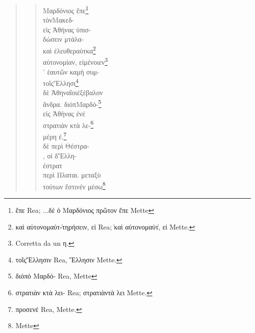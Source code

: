     \begin{quotation}
    \begin{verse}
    \small{
    \textgreek{ Μαρδόνιος ἔπε}\footnote{\textgreek{ἔπε} Rea; \textgreek{... δὲ ὁ Μαρδόνιος πρῶτον ἔπε} Mette} \\
    \textgreek{ τὸν\rbrk Μακεδ-\rbrk}\\
    \textgreek{ εἰς Ἀθήνας ὑπισ-\rbrk}\\
    \textgreek{ δώσειν μ τάλα-\rbrk}\\
    \textgreek{ καὶ ἐλευθερ αὐτ κα\rbrk}\footnote{\textgreek{ καὶ αὐτονομ αὐτ-\rbrk\| τηρήσειν, εἰ\rbrk} Rea; \textgreek{\rbrk \|  καὶ αὐτονομ αὐτ\rbrk \| , εἰ\rbrk} Mette.}\\
    \textgreek{ αὐτονομίαν, εἰ\rbrk μένοιεν}\footnote{Corretta da un \textgreek{η}.}\\
    \textgreek{’ ἑαυτῶν κα μὴ συμ-}\\
    \textgreek{ τοῖς\rbrk Ἕλλησ\d{ι}\rbrk}\footnote{\textgreek{ τοῖς\rbrk Ἕλλησιν} Rea, \textgreek{\rbrk{} \rbrk Ἕλλησιν} Mette.}\\
        \textgreek{ δὲ Ἀθηναῖοι\rbrk ἐξέβαλον} \\
        \textgreek{ ἄνδρα. διόπ Μαρδό-}\footnote{\textgreek{διόπ ὁ Μαρδό-} Rea, Mette}\\
        \textgreek{ εἰς Ἀθήνας ἐνέ}\\
        \textgreek{ στρατιὰν κ τὰ λε-\rbrk}\footnote{\textgreek{ στρατιὰν κ τὰ λει-} Rea;  \textgreek{ στρατιὰν\rbrk {} τὰ λει} Mette.}\\
        \textgreek{ μέρη ἐ.}\footnote{\textgreek{ προσενέ} Rea, Mette.}\\
        \textgreek{ δὲ περὶ Θ ἐστρα-}\\
        \textgreek{, οἱ δ Ἕλλη-}\\
        \textgreek{ ἐστρατ}\\
        \textgreek{ περὶ Πλαται. μεταξὺ}\\ 
        \textgreek{ τούτων ἔστιν\rbrk ἐν μέσω}\footnote{Mette}\\
}
\end{verse}
\end{quotation}
